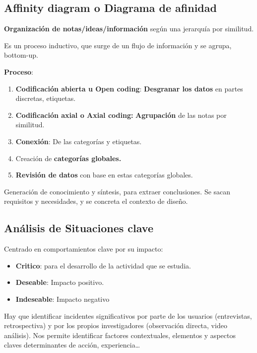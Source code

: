 \documentclass[12pt, twoside, openright]{report} %
\begin{document}
\subsection{Affinity diagram o Diagrama de
afinidad}

\textbf{Organización de notas/ideas/información} según una jerarquía por
similitud.

Es un proceso inductivo, que surge de un flujo de información y se
agrupa, bottom-up.

\textbf{Proceso}:

\begin{enumerate}
\item
  \textbf{Codificación abierta u Open coding}: \textbf{Desgranar los
  datos} en partes discretas, etiquetas.
\item
  \textbf{Codificación axial o Axial coding:} \textbf{Agrupación} de las
  notas por similitud.
\item
  \textbf{Conexión}: De las categorías y etiquetas.
\item
  Creación de \textbf{categorías globales.}
\item
  \textbf{Revisión de datos} con base en estas categorías globales.
\end{enumerate}

Generación de conocimiento y síntesis, para extraer conclusiones.
Se sacan requisitos y necesidades, y se concreta el contexto de diseño.

\subsection{Análisis de Situaciones
clave}

Centrado en comportamientos clave por su impacto:

\begin{itemize}

\item
  \textbf{Critico}: para el desarrollo de la actividad que se estudia.
\item
  \textbf{Deseable}: Impacto positivo.
\item
  \textbf{Indeseable}: Impacto negativo
\end{itemize}

Hay que identificar incidentes significativos por parte de los usuarios
(entrevistas, retrospectiva) y por los propios investigadores
(observación directa, video análisis). Nos permite identificar factores
contextuales, elementos y aspectos claves determinantes de acción,
experiencia\ldots{}
\end{document}

